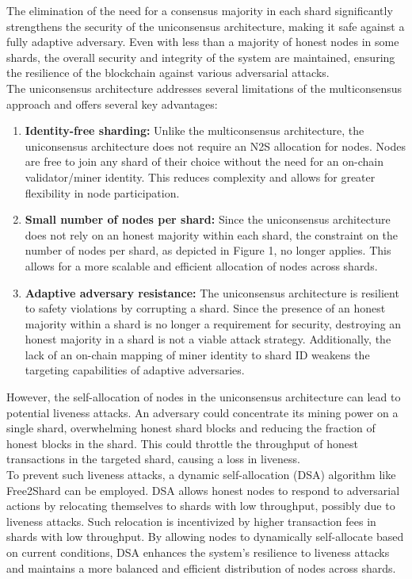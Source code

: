 \documentclass{report}
\begin{document}
The elimination of the need for a consensus majority in each shard significantly strengthens the security of the uniconsensus architecture, making it safe against a fully adaptive adversary. Even with less than a majority of honest nodes in some shards, the overall security and integrity of the system are maintained, ensuring the resilience of the blockchain against various adversarial attacks.\\
The uniconsensus architecture addresses several limitations of the multiconsensus approach and offers several key advantages:
\begin{enumerate}
	\item \textbf{Identity-free sharding:} Unlike the multiconsensus architecture, the uniconsensus architecture does not require an N2S allocation for nodes. Nodes are free to join any shard of their choice without the need for an on-chain validator/miner identity. This reduces complexity and allows for greater flexibility in node participation.
	\item \textbf{Small number of nodes per shard:} Since the uniconsensus architecture does not rely on an honest majority within each shard, the constraint on the number of nodes per shard, as depicted in Figure 1, no longer applies. This allows for a more scalable and efficient allocation of nodes across shards.
	\item \textbf{Adaptive adversary resistance:} The uniconsensus architecture is resilient to safety violations by corrupting a shard. Since the presence of an honest majority within a shard is no longer a requirement for security, destroying an honest majority in a shard is not a viable attack strategy. Additionally, the lack of an on-chain mapping of miner identity to shard ID weakens the targeting capabilities of adaptive adversaries.
\end{enumerate}
However, the self-allocation of nodes in the uniconsensus architecture can lead to potential liveness attacks. An adversary could concentrate its mining power on a single shard, overwhelming honest shard blocks and reducing the fraction of honest blocks in the shard. This could throttle the throughput of honest transactions in the targeted shard, causing a loss in liveness.\\
To prevent such liveness attacks, a dynamic self-allocation (DSA) algorithm like Free2Shard can be employed. DSA allows honest nodes to respond to adversarial actions by relocating themselves to shards with low throughput, possibly due to liveness attacks. Such relocation is incentivized by higher transaction fees in shards with low throughput. By allowing nodes to dynamically self-allocate based on current conditions, DSA enhances the system's resilience to liveness attacks and maintains a more balanced and efficient distribution of nodes across shards.
\end{document}
